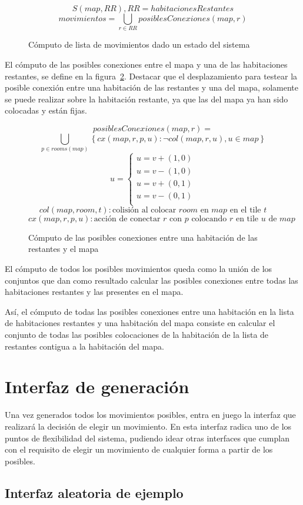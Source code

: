 \begin{figure}[h]
\centering
{
	$$S(map, RR), RR = habitacionesRestantes$$
	$$movimientos = \bigcup_{r \in RR}posiblesConexiones(map, r)$$
}
\caption{Cómputo de lista de movimientos dado un estado del sistema
\label{fig:posmovs}
}
\end{figure}

El cómputo de las posibles conexiones entre el mapa y una de las habitaciones restantes, se define en la figura~\ref{fig:poscons}. Destacar que el desplazamiento para testear la posible conexión entre una habitación de las restantes y una del mapa, solamente se puede realizar sobre la habitación restante, ya que las del mapa ya han sido colocadas y están fijas.

\begin{figure}[h]
	$$posiblesConexiones(map, r) = $$
	$$\bigcup_{p \in rooms(map)}  \left\{ cx(map,r,p,u) : \neg col(map, r, u), u \in map \right\}$$
	$$u = \begin{cases}
		u = v + (1,0) \\
		u = v - (1,0) \\
		u = v + (0,1) \\
		u = v - (0,1) \\
	\end{cases}$$
	$$col(map, room, t) : \text{colisión al colocar $room$ en $map$ en el tile $t$}$$
	$$cx(map,r,p,u) : \text{acción de conectar $r$ con $p$ colocando $r$ en tile $u$ de $map$}$$
\caption{Cómputo de las posibles conexiones entre una habitación de las restantes y el mapa
\label{fig:poscons}
}
\end{figure}

El cómputo de todos los posibles movimientos queda como la unión de los conjuntos que dan como resultado calcular las posibles conexiones entre todas las habitaciones restantes y las presentes en el mapa.

Así, el cómputo de todas las posibles conexiones entre una habitación en la lista de habitaciones restantes y una habitación del mapa consiste en calcular el conjunto de todas las posibles colocaciones de la habitación de la lista de restantes contigua a la habitación del mapa.


\section{Interfaz de generación}
Una vez generados todos los movimientos posibles, entra en juego la interfaz que realizará la decisión de elegir un movimiento. En esta interfaz radica uno de los puntos de flexibilidad del sistema, pudiendo idear otras interfaces que cumplan con el requisito de elegir un movimiento de cualquier forma a partir de los posibles.


\subsection{Interfaz aleatoria de ejemplo}

